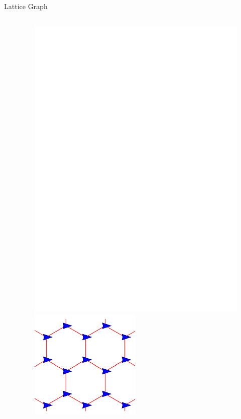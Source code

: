 \documentclass[10pt]{beamer}
\begin{document}
\begin{frame}{Lattice Graph}
    \begin{columns}[T] %
      \begin{column}{.5\textwidth}
      
      \end{column}%
      \begin{column}{.5\textwidth}   
        \begin{figure}
          \begin{minipage}{\linewidth}
            \centering
          \includegraphics[scale=0.4]{figs/hex}
          \end{minipage}
          \vspace{2mm}
          \begin{minipage}{\linewidth}
            \centering
          \includegraphics[scale=0.75]{figs/hexagonlattice}
          \end{minipage}
        \end{figure}
       

\end{column}
\end{columns}
\end{frame}
\end{document}
